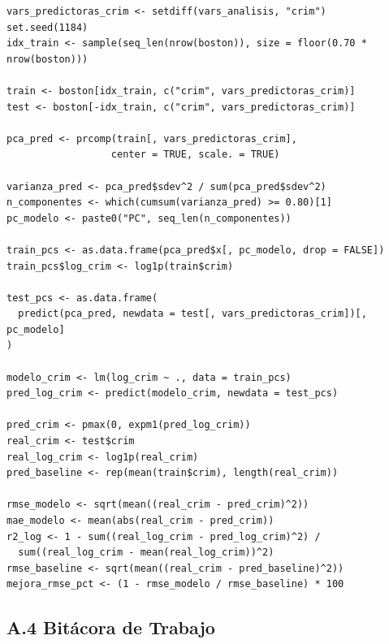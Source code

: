 \documentclass[10pt,a4paper]{article}
\begin{document}
\begin{lstlisting}[caption={Predicción de criminalidad con componentes principales.}]
vars_predictoras_crim <- setdiff(vars_analisis, "crim")
set.seed(1184)
idx_train <- sample(seq_len(nrow(boston)), size = floor(0.70 * nrow(boston)))

train <- boston[idx_train, c("crim", vars_predictoras_crim)]
test <- boston[-idx_train, c("crim", vars_predictoras_crim)]

pca_pred <- prcomp(train[, vars_predictoras_crim],
                  center = TRUE, scale. = TRUE)

varianza_pred <- pca_pred$sdev^2 / sum(pca_pred$sdev^2)
n_componentes <- which(cumsum(varianza_pred) >= 0.80)[1]
pc_modelo <- paste0("PC", seq_len(n_componentes))

train_pcs <- as.data.frame(pca_pred$x[, pc_modelo, drop = FALSE])
train_pcs$log_crim <- log1p(train$crim)

test_pcs <- as.data.frame(
  predict(pca_pred, newdata = test[, vars_predictoras_crim])[, pc_modelo]
)

modelo_crim <- lm(log_crim ~ ., data = train_pcs)
pred_log_crim <- predict(modelo_crim, newdata = test_pcs)

pred_crim <- pmax(0, expm1(pred_log_crim))
real_crim <- test$crim
real_log_crim <- log1p(real_crim)
pred_baseline <- rep(mean(train$crim), length(real_crim))

rmse_modelo <- sqrt(mean((real_crim - pred_crim)^2))
mae_modelo <- mean(abs(real_crim - pred_crim))
r2_log <- 1 - sum((real_log_crim - pred_log_crim)^2) /
  sum((real_log_crim - mean(real_log_crim))^2)
rmse_baseline <- sqrt(mean((real_crim - pred_baseline)^2))
mejora_rmse_pct <- (1 - rmse_modelo / rmse_baseline) * 100
\end{lstlisting}

\subsection*{A.4 Bitácora de Trabajo}
\end{document}
